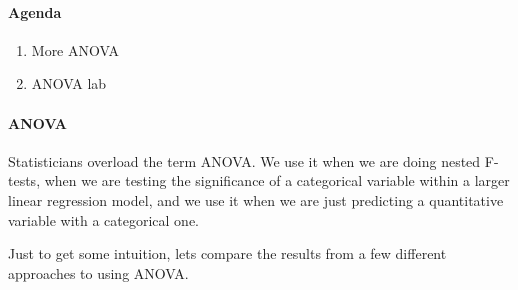 \documentclass[10pt]{article}\usepackage[]{graphicx}\usepackage[]{color}
\begin{document}
\paragraph{Agenda}
\begin{enumerate}
  \itemsep0em
  \item More ANOVA
  \item ANOVA lab
\end{enumerate}



\paragraph{ANOVA}
Statisticians overload the term ANOVA. We use it when we are doing nested F-tests, when we are testing the significance of a categorical variable within a larger linear regression model, and we use it when we are just predicting a quantitative variable with a categorical one.


Just to get some intuition, lets compare the results from a few different approaches to using ANOVA. 
	
\end{document}
